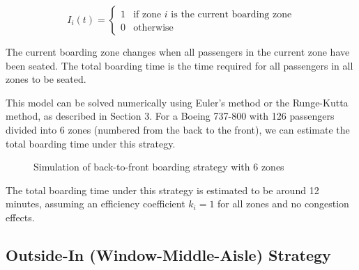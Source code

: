 \documentclass[12pt,a4paper]{article}
\begin{document}
\begin{equation}
I_i(t) = 
\begin{cases}
1 & \text{if zone } i \text{ is the current boarding zone} \\
0 & \text{otherwise}
\end{cases}
\label{eq:indicator}
\end{equation}

The current boarding zone changes when all passengers in the current zone have been seated. The total boarding time is the time required for all passengers in all zones to be seated.

This model can be solved numerically using Euler's method or the Runge-Kutta method, as described in Section 3. For a Boeing 737-800 with 126 passengers divided into 6 zones (numbered from the back to the front), we can estimate the total boarding time under this strategy.

\begin{figure}[H]
\centering
{}
\caption{Simulation of back-to-front boarding strategy with 6 zones}
\label{fig:back_to_front}
\end{figure}

The total boarding time under this strategy is estimated to be around 12 minutes, assuming an efficiency coefficient $k_i = 1$ for all zones and no congestion effects.

\subsection{Outside-In (Window-Middle-Aisle) Strategy}
\end{document}
